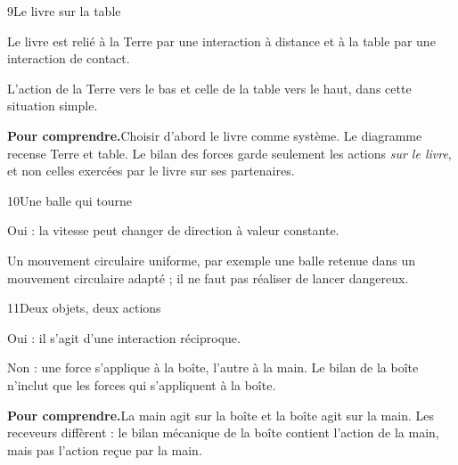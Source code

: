 \par\noindent\begin{minipage}{\linewidth}
\begin{corrige}{9}{Le livre sur la table}
\begin{questions}
\item Le livre est relié à la Terre par une interaction à distance et à la table par une interaction de contact.
\item L’action de la Terre vers le bas et celle de la table vers le haut, dans cette situation simple.
\end{questions}
\par\smallskip\noindent\textbf{Pour comprendre.}\enspace Choisir d’abord le livre comme système. Le diagramme recense Terre et table. Le bilan des forces garde seulement les actions \emph{sur le livre}, et non celles exercées par le livre sur ses partenaires.\par
{}
\end{corrige}
\end{minipage}
\par\noindent\begin{minipage}{\linewidth}
\begin{corrige}{10}{Une balle qui tourne}
\begin{questions}
\item Oui : la vitesse peut changer de direction à valeur constante.
\item Un mouvement circulaire uniforme, par exemple une balle retenue dans un mouvement circulaire adapté ; il ne faut pas réaliser de lancer dangereux.
\end{questions}
\end{corrige}
\end{minipage}
\par\noindent\begin{minipage}{\linewidth}
\begin{corrige}{11}{Deux objets, deux actions}
\begin{questions}
\item Oui : il s’agit d’une interaction réciproque.
\item Non : une force s’applique à la boîte, l’autre à la main. Le bilan de la boîte n’inclut que les forces qui s’appliquent à la boîte.
\end{questions}
\par\smallskip\noindent\textbf{Pour comprendre.}\enspace La main agit sur la boîte et la boîte agit sur la main. Les receveurs diffèrent : le bilan mécanique de la boîte contient l’action de la main, mais pas l’action reçue par la main.\par
{}
\end{corrige}
\end{minipage}
